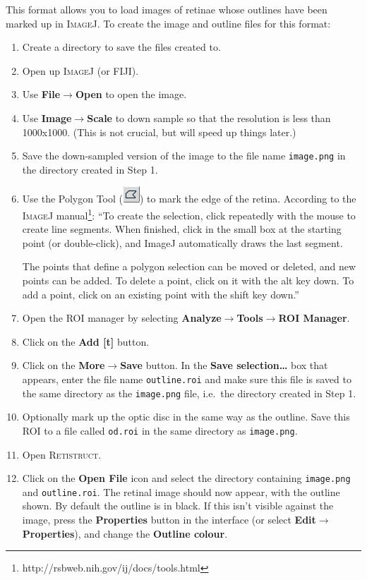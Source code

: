 \documentclass{article}
\begin{document}
This format allows you to load images of retinae whose outlines have
been marked up in \textsc{ImageJ}. To create the image and outline
files for this format:
\begin{enumerate}
\item Create a directory to save the files created to.
\item Open up \textsc{ImageJ} (or FIJI).
\item Use \textbf{File$\rightarrow$Open} to open the image.
\item Use \textbf{Image$\rightarrow$Scale} to down sample so that the
  resolution is less than 1000x1000. (This is not crucial, but will
  speed up things later.)
\item Save the down-sampled version of the image to the file name
  \texttt{image.png} in the directory created in Step 1.
\item Use the Polygon Tool
  (\includegraphics[height=\baselineskip]{poly}) to mark the edge of
  the retina. According to the \textsc{ImageJ}
  manual\footnote{http://rsbweb.nih.gov/ij/docs/tools.html}: ``To
  create the selection, click repeatedly with the mouse to create line
  segments. When finished, click in the small box at the starting
  point (or double-click), and ImageJ automatically draws the last
  segment.

  The points that define a polygon selection can be moved or deleted,
  and new points can be added. To delete a point, click on it with the
  alt key down. To add a point, click on an existing point with the
  shift key down.''
\item Open the ROI manager by selecting
\textbf{Analyze$\rightarrow$Tools$\rightarrow$ROI Manager}.
\item Click on the \textbf{Add [t]} button.
\item Click on the \textbf{More$\rightarrow$Save} button. In the \textbf{Save
selection\dots} box that appears, enter the file name
\texttt{outline.roi} and make sure this file is saved to the same
directory as the \texttt{image.png} file, i.e.\ the directory created
in Step 1.
\item Optionally mark up the optic disc in the same way as the
  outline. Save this ROI to a file called \texttt{od.roi} in the same
  directory as \texttt{image.png}.
\item Open \textsc{Retistruct}.
\item Click on the \textbf{Open File} icon and select the directory
containing \texttt{image.png} and \texttt{outline.roi}. The retinal
image should now appear, with the outline shown. By default the
outline is in black. If this isn't visible against the image, press
the \textbf{Properties} button in the interface (or select \textbf{Edit$\rightarrow$Properties}), and change the
\textbf{Outline colour}.
\end{enumerate}
\end{document}
